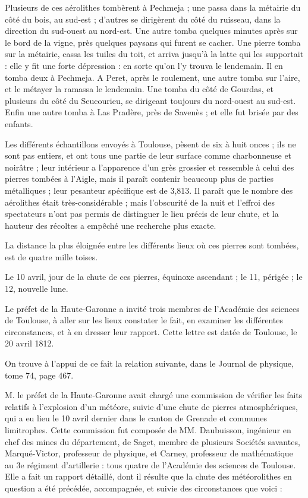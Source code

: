 \documentclass[a4paper, 12pt, oneside, french]{article}
\begin{document}
\og Plusieurs de ces aérolithes tombèrent à Pechmeja ; une passa dans la métairie du côté du bois, au sud-est ; d'autres se dirigèrent du côté du ruisseau, dans la direction du sud-ouest au nord-est. Une autre tomba quelques minutes après sur le bord de la vigne, près quelques paysans qui furent se cacher. Une pierre tomba sur la métairie, cassa les tuiles du toit, et arriva jusqu'à la latte qui les supportait : elle y fit une forte dépression : en sorte qu'on l'y trouva le lendemain. Il en tomba deux à Pechmeja. A Peret, après le roulement, une autre tomba sur l'aire, et le métayer la ramassa le lendemain. Une tomba du côté de Gourdas, et plusieurs du côté du Seucourieu, se dirigeant toujours du nord-ouest au sud-est. Enfin une autre tomba à Las Pradère, près de Savenès ; et elle fut brisée par des enfants. \fg

\og Les différents échantillons envoyés à Toulouse, pèsent de six à huit onces ; ils ne sont pas entiers, et ont tous une partie de leur surface comme charbonneuse et noirâtre ; leur intérieur a l'apparence d'un grès grossier et ressemble à celui des pierres tombées à l'Aigle, mais il paraît contenir beaucoup plus de parties métalliques ; leur pesanteur spécifique est de 3,813. Il paraît que le nombre des aérolithes était très-considérable ; mais l'obscurité de la nuit et l'effroi des spectateurs n'ont pas permis de distinguer le lieu précis de leur chute, et la hauteur des récoltes a empêché une recherche plus exacte. \fg

\og La distance la plus éloignée entre les différents lieux où ces pierres sont tombées, est de quatre mille toises. \fg

\og Le 10 avril, jour de la chute de ces pierres, équinoxe ascendant ; le 11, périgée ; le 12, nouvelle lune. \fg

\og Le préfet de la Haute-Garonne a invité trois membres de l'Académie des sciences de Toulouse, à aller sur les lieux constater le fait, en examiner les différentes circonstances, et à en dresser leur rapport. \fg Cette lettre est datée de Toulouse, le 20 avril 1812.

On trouve à l'appui de ce fait la relation suivante, dans le Journal de physique, tome 74, page 467.

\og M. le préfet de la Haute-Garonne avait chargé une commission de vérifier les faits relatifs à l'explosion d'un météore, suivie d'une chute de pierres atmosphériques, qui a eu lieu le 10 avril dernier dans le canton de Grenade et communes limitrophes. Cette commission fut composée de MM. Daubuisson, ingénieur en chef des mines du département, de Saget, membre de plusieurs Sociétés savantes, Marqué-Victor, professeur de physique, et Carney, professeur de mathématique au 3e régiment d'artillerie : tous quatre de l'Académie des sciences de Toulouse. Elle a fait un rapport détaillé, dont il résulte que la chute des météorolithes en question a été précédée, accompagnée, et suivie des circonstances que voici : \fg
\end{document}
